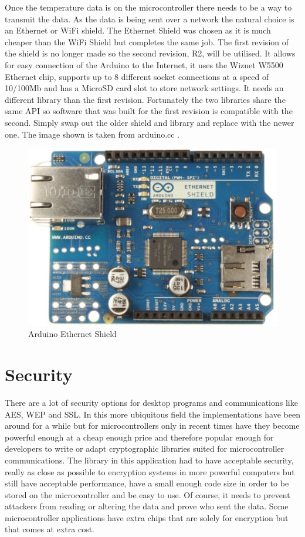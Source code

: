 Once the temperature data is on the microcontroller there needs to be a way to transmit the data. As the data is being sent over a network the natural choice is an Ethernet or WiFi shield. The Ethernet Shield was chosen as it is much cheaper than the WiFi Shield but completes the same job. The first revision of the shield is no longer made so the second revision, R2, will be utilised. It allows for easy connection of the Arduino to the Internet, it uses the Wiznet W5500 Ethernet chip, supports up to 8 different socket connections at a speed of 10/100Mb and has a MicroSD card slot to store network settings. It needs an different library than the first revision\cite{eth2}. Fortunately the two libraries share the same API so software that was built for the first revision is compatible with the second. Simply swap out the older shield and library and replace with the newer one. The image shown is taken from arduino.cc \cite{ethimage}.

\begin{figure}[H]
	\centering
	\includegraphics[width=.4\linewidth]{Figures/ethernet.jpg}
	\caption{Arduino Ethernet Shield}
	\label{fig:eth}
\end{figure}

\section{Security}

There are a lot of security options for desktop programs and communications like AES, WEP and SSL. In this more ubiquitous field the implementations have been around for a while but for microcontrollers only in recent times have they become powerful enough at a cheap enough price and therefore popular enough for developers to write or adapt cryptographic libraries suited for microcontroller communications. The library in this application had to have acceptable security, really as close as possible to encryption systems in more powerful computers but still have acceptable performance, have a small enough code size in order to be stored on the microcontroller and be easy to use. Of course, it needs to prevent attackers from reading or altering the data and prove who sent the data. Some microcontroller applications have extra chips that are solely for encryption but that comes at extra cost.

